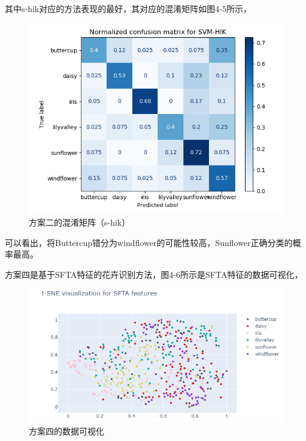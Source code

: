 \documentclass[supercite]{HustGraduPaper}
\begin{document}
\begin{sloppypar}
\begin{spacing}{1.25}
\begin{longtable}[c]{lllll}
          \end{longtable}
        \end{spacing}
      其中s-hik对应的方法表现的最好，其对应的混淆矩阵如图4-5所示，\begin{figure}[H]
        \setlength{\abovecaptionskip}{0.2cm}
        \setlength{\belowcaptionskip}{-0.cm}
          \centering%
          \includegraphics[scale=0.4]{5.png}
          \caption{方案二的混淆矩阵（s-hik）}
        \end{figure}
      可以看出，将Buttercup错分为windflower的可能性较高，Sunflower正确分类的概率最高。

      方案四是基于SFTA特征的花卉识别方法，图4-6所示是SFTA特征的数据可视化，\begin{figure}[H]
        \setlength{\abovecaptionskip}{0.2cm}
        \setlength{\belowcaptionskip}{-0.cm}
          \centering%
          \includegraphics[scale=0.6]{6.png}
          \caption{方案四的数据可视化}
        \end{figure}
      

\end{sloppypar}
\end{document}
